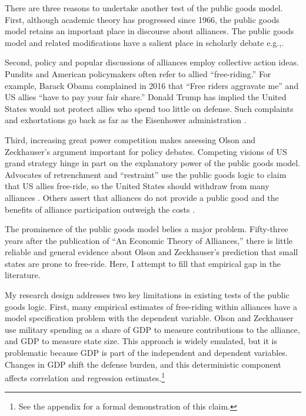 \documentclass[12pt]{article}
\begin{document}
There are three reasons to undertake another test of the public goods model. 
First, although academic theory has progressed since 1966, the public goods model retains an important place in discourse about alliances.
The public goods model and related modifications have a salient place in scholarly debate e.g.,\citep{Walt1990, Sandler1993, Mearsheimer1994, Goldstein1995, SandlerHartley2001, Garfinkel2004, Walt2009, Norrlof2010, Barrett2010, PluemperNeumayer2015}.


Second, policy and popular discussions of alliances employ collective action ideas.
Pundits and American policymakers often refer to allied ``free-riding.'' 
For example, Barack Obama complained in 2016 that ``Free riders aggravate me'' and US allies ``have to pay your fair share.'' 
Donald Trump has implied the United States would not protect allies who spend too little on defense. 
Such complaints and exhortations go back as far as the Eisenhower administration \citep{Lanoszka2015}.


Third, increasing great power competition makes assessing Olson and Zeckhauser's argument important for policy debates. 
Competing visions of US grand strategy hinge in part on the explanatory power of the public goods model. 
Advocates of retrenchment and ``restraint'' use the public goods logic to claim that US allies free-ride, so the United States should withdraw from many alliances \citep{Preble2009, Posen2014}. 
Others assert that alliances do not provide a public good and the benefits of alliance participation outweigh the costs \citep{Brooksetal2013, BrandsFeaver2017}. 


The prominence of the public goods model belies a major problem.
Fifty-three years after the publication of ``An Economic Theory of Alliances,'' there is little reliable and general evidence about Olson and Zeckhauser's prediction that small states are prone to free-ride. 
Here, I attempt to fill that empirical gap in the literature. 


My research design addresses two key limitations in existing tests of the public goods logic.
First, many empirical estimates of free-riding within alliances have a model specification problem with the dependent variable.
Olson and Zeckhauser use military spending as a share of GDP to measure contributions to the alliance, and GDP to measure state size.
This approach is widely emulated, but it is problematic because GDP is part of the independent and dependent variables.
Changes in GDP shift the defense burden, and this deterministic component affects correlation and regression estimates.\footnote{See the appendix for a formal demonstration of this claim.}  
\end{document}
